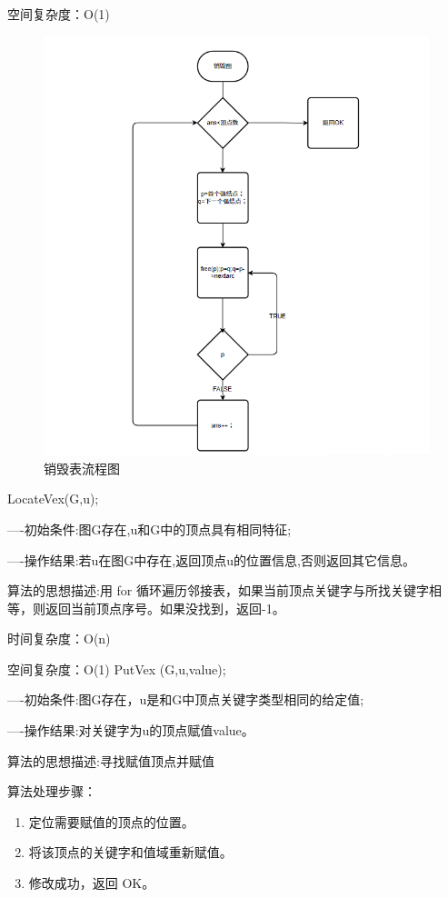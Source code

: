 \documentclass[supercite]{Experimental_Report}
\theoremstyle{definition}
\begin{document}
空间复杂度：O(1)
\begin{figure}[H] %
	\begin{center}
		\includegraphics[width=0.8\linewidth]{images/2.3.2.png}
		\caption{销毁表流程图}
	\end{center}
\end{figure}
LocateVex(G,u);

----初始条件:图G存在,u和G中的顶点具有相同特征;

----操作结果:若u在图G中存在,返回顶点u的位置信息,否则返回其它信息。

算法的思想描述:用 for 循环遍历邻接表，如果当前顶点关键字与所找关键字相等，则返回当前顶点序号。如果没找到，返回-1。

时间复杂度：O(n)

空间复杂度：O(1)
PutVex (G,u,value);

----初始条件:图G存在，u是和G中顶点关键字类型相同的给定值;

----操作结果:对关键字为u的顶点赋值value。

算法的思想描述:寻找赋值顶点并赋值

算法处理步骤：
\begin{enumerate}
	\renewcommand{\labelenumi}{\theenumi)}
	\item 定位需要赋值的顶点的位置。
	\item 将该顶点的关键字和值域重新赋值。
	\item 修改成功，返回 OK。
\end{enumerate}
\end{document}
